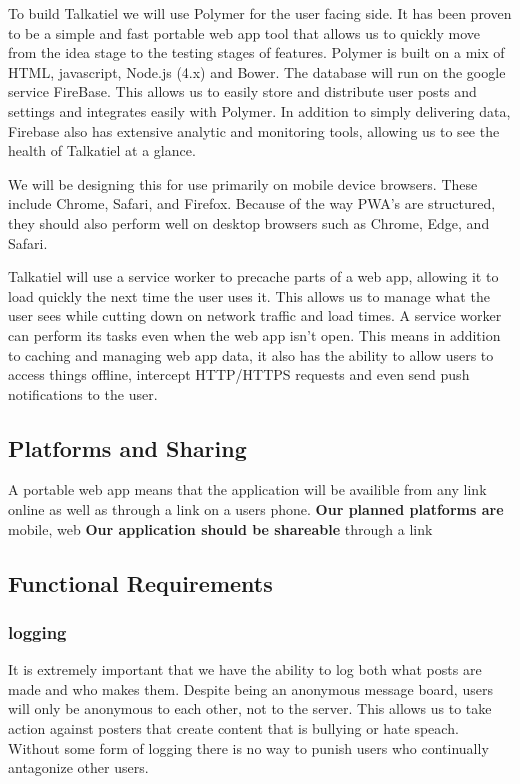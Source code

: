 \documentclass[12pt]{article}
\begin{document}
	To build Talkatiel we will use Polymer for the user facing side.  It has been proven to be a simple and fast portable web app tool that allows us to quickly move from the idea stage to the testing stages of features.  Polymer is built on a mix of HTML, javascript, Node.js (4.x) and Bower.  The database will run on the google service FireBase.  This allows us to easily store and distribute user posts and settings and integrates easily with Polymer.  In addition to simply delivering data, Firebase also has extensive analytic and monitoring tools, allowing us to see the health of Talkatiel at a glance.

	We will be designing this for use primarily on mobile device browsers.  These include Chrome, Safari, and Firefox.  Because of the way PWA’s are structured, they should also perform well on desktop browsers such as Chrome, Edge, and Safari.

  Talkatiel will use a service worker to precache parts of a web app, allowing it to load quickly the next time the user uses it.  This allows us to manage what the user sees while cutting down on network traffic and load times.  A service worker can perform its tasks even when the web app isn’t open.  This means in addition to caching and managing web app data, it also has the ability to allow users to access things offline, intercept HTTP/HTTPS requests and even send push notifications to the user.
\subsection{Platforms and Sharing}
A portable web app means that the application will be availible from any link online as well as through a link on a users phone.\newline\newline
\textbf{Our planned platforms are} mobile, web\newline
\textbf{Our application should be shareable} through a link\newline

\subsection{Functional Requirements}
\subsubsection{logging}
It is extremely important that we have the ability to log both what posts are made and who makes them.  Despite being an anonymous message board, users will only be anonymous to each other, not to the server.  This allows us to take action against posters that create content that is bullying or hate speach.  Without some form of logging there is no way to punish users who continually antagonize other users.
\end{document}
